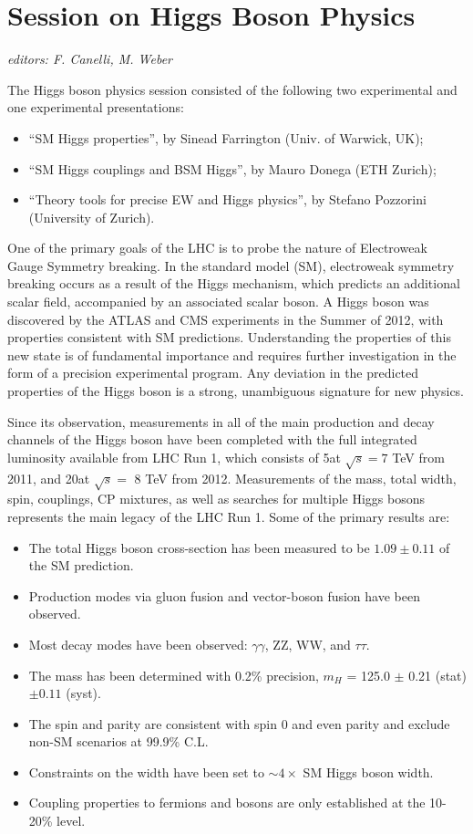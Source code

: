 \section{Session on Higgs Boson Physics}\label{higgs}{\it editors: F. Canelli, M. Weber}

\noindent The Higgs boson physics session consisted of the following two experimental and one experimental presentations:
\begin{itemize} \setlength{\itemsep}{-1ex}
\item ``SM Higgs properties'', by Sinead Farrington (Univ. of Warwick, UK);
\item ``SM Higgs couplings and BSM Higgs'', by Mauro Donega (ETH Zurich);
\item ``Theory tools for precise EW and Higgs physics'', by Stefano Pozzorini (University of Zurich).
\end{itemize}

\noindent One of the primary goals of the LHC is to probe the nature of Electroweak Gauge 
Symmetry breaking. In the standard model (SM), electroweak symmetry
breaking occurs as a result of the Higgs mechanism, which predicts an
additional scalar field, accompanied by an associated scalar boson. A
Higgs boson was discovered by the ATLAS and CMS experiments in the
Summer of 2012, with properties consistent with SM predictions.
Understanding the properties of this new state is of fundamental
importance and requires further investigation in the form of a precision
experimental program. Any deviation in the predicted properties of the
Higgs boson is a strong, unambiguous signature for new physics. 
\medskip

\noindent Since its observation, measurements in all of the main production and decay
channels of the Higgs boson have been completed with the full integrated
luminosity available from LHC Run 1, which consists of 5\fb  at $\sqrt{s} = 7$
TeV from 2011, and 20\fb at  $\sqrt{s} =$  8 TeV from 2012. 
Measurements of the mass, total width, spin, couplings, CP mixtures, as well as searches for
multiple Higgs bosons represents the main legacy of the LHC Run 1. Some
of the primary results are: 

\begin{itemize}
\item The total Higgs boson cross-section has been measured to be $1.09 \pm 0.11$ of the SM prediction.
\item Production modes via gluon fusion and vector-boson fusion have been observed. 
\item Most decay modes have been observed: $\gamma \gamma$, ZZ, WW, and $\tau\tau$.
\item The mass has been determined with 0.2\% precision,  $m_H$ = 125.0 $\pm$ 0.21 (stat) $\pm 0.11$ (syst).
\item The spin and parity are consistent with spin 0 and even parity and exclude non-SM scenarios at 99.9\% C.L.
\item Constraints on the width have been set to $\sim 4 \times$  SM Higgs boson width. 
\item Coupling properties to fermions and bosons are only established at the 10-20\% level.
\end{itemize}

